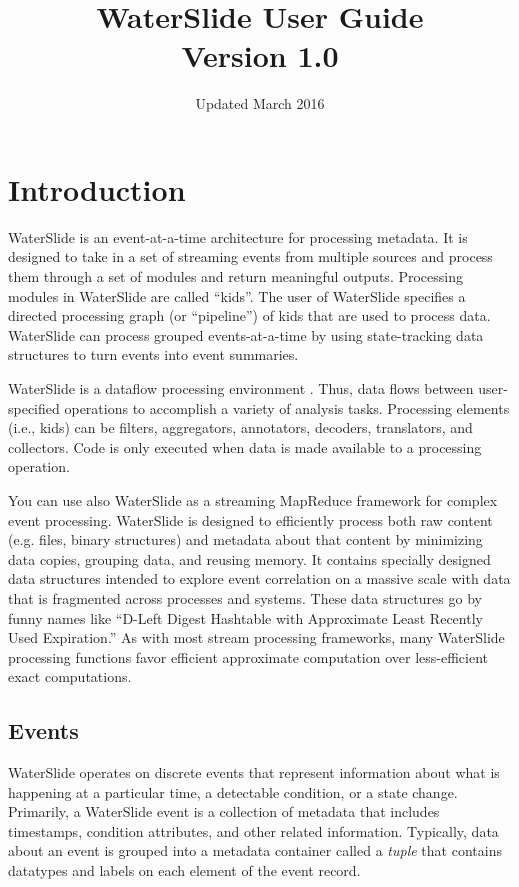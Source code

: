 \documentclass[11pt]{article}
\title{WaterSlide User Guide\\Version 1.0}
\date{Updated March 2016}
\begin{document}
\maketitle

\thispagestyle{fancy}

\pagestyle{fancy}
\fancyhf{}
\fancyhead[c]{}
\fancyfoot[R]{\thepage }
\fancyfoot[c]{}

\lstset{
  language=sh, 
  frame=single, 
  basicstyle=\ttfamily, 
  showstringspaces=false,
  breakatwhitespace=true,
  breaklines=true,
  commentstyle=\itshape,
  aboveskip=9pt,
  belowskip=6pt
}

\section{Introduction}
WaterSlide is an event-at-a-time architecture for processing metadata.   It is designed to
take in a set of streaming events from multiple sources and process them through a set 
of modules and return meaningful outputs.  Processing modules in WaterSlide are called ``kids''.  
The user of WaterSlide specifies a directed processing graph (or ``pipeline'') of kids that are used to process data.  
WaterSlide can process grouped events-at-a-time by using state-tracking data structures to turn events into event summaries.

WaterSlide is a dataflow processing environment \cite{dataflow1}. Thus, data flows between user-specified operations to
accomplish a variety of analysis tasks.  Processing elements (i.e., kids) can be filters,
aggregators, annotators, decoders, translators, and collectors.  Code is only executed when data is
made available to a processing operation. 

You can use also WaterSlide as a streaming MapReduce framework \cite{MapReduceOnline,S4} for complex event processing.  WaterSlide is
designed to efficiently process both raw content (e.g. files, binary structures) and metadata
about that content by minimizing data copies, grouping data, and reusing memory.  It contains
specially designed data structures intended to explore event correlation on a massive scale with
data that is fragmented across processes and systems.  These data structures go by funny names like
``D-Left Digest Hashtable with Approximate Least Recently Used Expiration.''  As with most stream
processing frameworks, many WaterSlide processing functions favor efficient approximate computation
over less-efficient exact computations.

\subsection{Events}
WaterSlide operates on discrete events that represent information about what is happening at a
particular time, a detectable condition, or a state change.  Primarily, a WaterSlide event is a collection of metadata 
that includes timestamps, condition attributes, and other
related information. Typically, data about an event is grouped into a metadata container 
called a \emph{tuple} that contains datatypes and labels on each element of the event
record.  
\end{document}
